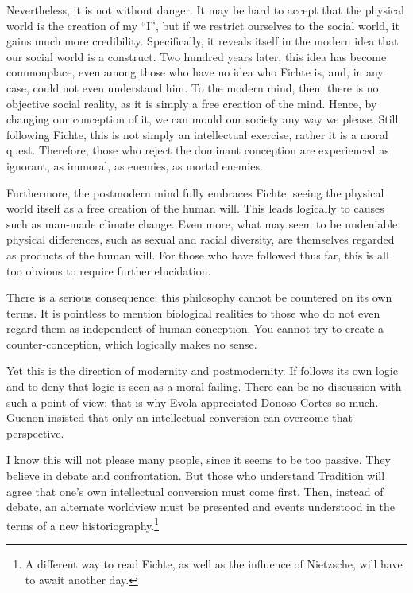 Nevertheless, it is not without danger. It may be hard to accept that the physical world is the creation of my “I”, but
if we restrict ourselves to the social world, it gains much more credibility. Specifically, it reveals itself in the
modern idea that our social world is a construct. Two hundred years later, this idea has become commonplace, even among
those who have no idea who Fichte is, and, in any case, could not even understand him. To the modern mind, then, there
is no objective social reality, as it is simply a free creation of the mind. Hence, by changing our conception of it,
we can mould our society any way we please. Still following Fichte, this is not simply an intellectual exercise, rather
it is a moral quest. Therefore, those who reject the dominant conception are experienced as ignorant, as immoral, as
enemies, as mortal enemies.

Furthermore, the postmodern mind fully embraces Fichte, seeing the physical world itself as a free creation of the human
will. This leads logically to causes such as man-made climate change. Even more, what may seem to be undeniable
physical differences, such as sexual and racial diversity, are themselves regarded as products of the human will. For
those who have followed thus far, this is all too obvious to require further elucidation.

There is a serious consequence: this philosophy cannot be countered on its own terms. It is pointless to mention
biological realities to those who do not even regard them as independent of human conception. You cannot try to create
a counter-conception, which logically makes no sense.

Yet this is the direction of modernity and postmodernity. If follows its own logic and to deny that logic is seen as a
moral failing. There can be no discussion with such a point of view; that is why Evola appreciated Donoso Cortes so
much. Guenon insisted that only an intellectual conversion can overcome that perspective.

I know this will not please many people, since it seems to be too passive. They believe in debate and confrontation. But
those who understand Tradition will agree that one's own intellectual conversion must come first. Then,
instead of debate, an alternate worldview must be presented and events understood in the terms of a new historiography.\footnote{A different way to read Fichte, as well as the influence of Nietzsche, will have to await another day.}


